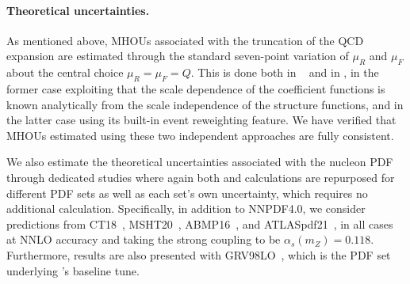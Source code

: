 \paragraph{Theoretical uncertainties.}
%
As mentioned above, MHOUs associated with the truncation of the QCD expansion are estimated through the standard seven-point variation of $\mu_R$ and $\mu_F$ about the central choice $\mu_R = \mu_F = Q$.
%
This is done both in \yadism~\cite{Candido:2024rkr,Candido:2023utz} and in \powheg, in the former case exploiting that the scale dependence of the coefficient functions is known analytically 
from the scale independence of the structure functions, and in the latter case using its built-in event reweighting feature.
%
We have verified that MHOUs estimated using these two independent approaches are fully consistent. 

We also estimate the theoretical uncertainties associated with the nucleon PDF through dedicated studies where again both \yadism and \powheg calculations are repurposed for different PDF sets as well as each set's own
uncertainty, which requires no additional calculation.
%
Specifically, in addition to NNPDF4.0, we consider predictions from CT18~\cite{Hou:2019efy}, MSHT20~\cite{Bailey:2020ooq}, ABMP16~\cite{Alekhin:2017kpj}, and ATLASpdf21~\cite{ATLAS:2021vod}, in all cases at NNLO accuracy and taking the strong coupling to be $\alpha_s(m_Z)=0.118$.
%
Furthermore, results are also presented with GRV98LO~\cite{Gluck:1998xa}, which is the PDF set underlying \genie's baseline tune. 


